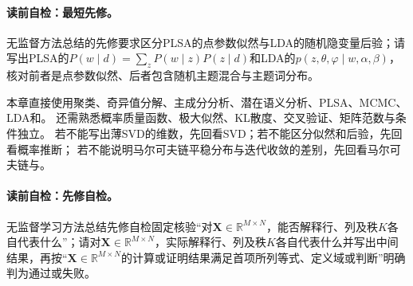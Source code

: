 
\label{struct:V5-C08-CH02}
\paragraph{读前自检：最短先修。}无监督方法总结的先修要求区分PLSA的点参数似然与LDA的随机隐变量后验；请写出PLSA的$P(w\mid d)=\sum_zP(w\mid z)P(z\mid d)$和LDA的$p(z,\theta,\varphi\mid w,\alpha,\beta)$，核对前者是点参数似然、后者包含随机主题混合与主题词分布。\par

\begin{prerequisitebox}
本章直接使用聚类、奇异值分解、主成分分析、潜在语义分析、PLSA、MCMC、LDA和\PageRank{}。
还需熟悉概率质量函数、极大似然、KL散度、交叉验证、矩阵范数与条件独立。
若不能写出薄SVD的维数，先回看SVD；若不能区分似然和后验，先回看概率推断；
若不能说明马尔可夫链平稳分布与迭代收敛的差别，先回看马尔可夫链与\PageRank{}。
\end{prerequisitebox}

\label{struct:V5-C08-CH03}
\paragraph{读前自检：先修自检。}无监督学习方法总结先修自检固定核验“对$\boldsymbol X\in\mathbb R^{M\times N}$，能否解释行、列及秩$K$各自代表什么”；请对$\boldsymbol X\in\mathbb R^{M\times N}$，实际解释行、列及秩$K$各自代表什么并写出中间结果，再按“$\boldsymbol X\in\mathbb R^{M\times N}$的计算或证明结果满足首项所列等式、定义域或判断”明确判为通过或失败。\par

